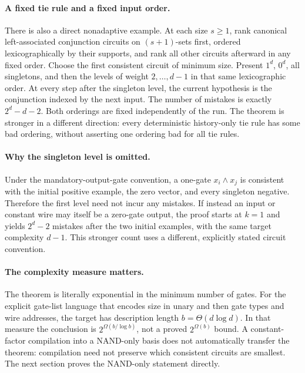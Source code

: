 \paragraph{A fixed tie rule and a fixed input order.}
There is also a direct nonadaptive example. At each size $s\ge1$,
rank canonical left-associated conjunction circuits on $(s+1)$-sets
first, ordered lexicographically by their supports, and rank all
other circuits afterward in any fixed order. Choose the first
consistent circuit of minimum size. Present $1^d$, $0^d$, all
singletons, and then the levels of weight $2,\ldots,d-1$ in that
same lexicographic order. At every step after the singleton level,
the current hypothesis is the conjunction indexed by the next
input. The number of mistakes is exactly $2^d-d-2$. Both orderings
are fixed independently of the run. The theorem is stronger in a
different direction: every deterministic history-only tie rule
has some bad ordering, without asserting one ordering bad for
all tie rules.

\paragraph{Why the singleton level is omitted.}
Under the mandatory-output-gate convention, a one-gate
$x_i\wedge x_j$ is consistent with the initial positive example,
the zero vector, and every singleton negative. Therefore the
first level need not incur any mistakes. If instead an input or
constant wire may itself be a zero-gate output, the proof starts
at $k=1$ and yields $2^d-2$ mistakes after the two initial examples,
with the same target complexity $d-1$. This stronger count uses
a different, explicitly stated circuit convention.

\paragraph{The complexity measure matters.}
The theorem is literally exponential in the minimum number of
gates. For the explicit gate-list language that encodes size in
unary and then gate types and wire addresses, the target has
description length $b=\Theta(d\log d)$. In that measure the
conclusion is $2^{\Omega(b/\log b)}$, not a proved
$2^{\Omega(b)}$ bound. A constant-factor compilation into a
NAND-only basis does not automatically transfer the theorem:
compilation need not preserve which consistent circuits are
smallest. The next section proves the NAND-only statement directly.

